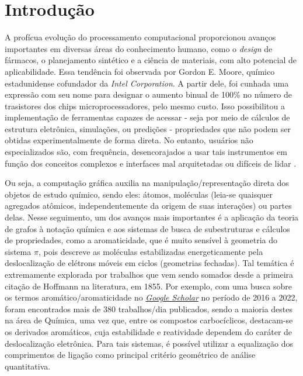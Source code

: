 \chapter{Introdução}

A profícua evolução do processamento computacional proporcionou avanços importantes em diversas áreas do conhecimento humano, como o \textit{design} de fármacos, o planejamento sintético e a ciência de materiais, com alto potencial de aplicabilidade. Essa tendência foi observada por Gordon E. Moore, químico estadunidense 
cofundador da \textit{Intel Corporation}. A partir dele, foi cunhada uma expressão com seu nome para designar o aumento binual de 100\% no número de trasistores dos chips microprocessadores, pelo mesmo custo. Isso possibilitou a implementação de ferramentas capazes de acessar - seja por meio de cálculos de estrutura eletrônica, 
simulações, ou predições - propriedades que não podem ser obtidas experimentalmente de forma direta. No entanto, usuários não especializados são, com frequência, desencorajados a usar tais instrumentos em função dos conceitos complexos e interfaces mal arquitetadas ou difíceis de lidar \autocite{Allouche2010}.

Ou seja, a computação gráfica auxilia na manipulação/representação direta dos objetos de estudo químico, sendo eles: átomos, moléculas (leia-se quaisquer agregados atômicos, independentemente da origem de suas interações) ou partes delas. Nesse seguimento, um dos avanços mais importantes é a aplicação da teoria de grafos à notação química e aos sistemas de busca de subestruturas e cálculos de propriedades, como a aromaticidade, que é muito sensível à geometria do sistema $\pi$, pois descreve as moléculas estabilizadas energeticamente pela deslocalização de elétrons móveis em ciclos (geometrias fechadas). Tal temática é extremamente explorada por trabalhos que vem sendo somados desde a primeira citação de Hoffmann na literatura, em 1855. Por exemplo, com uma busca sobre os termos aromático/aromaticidade no \textit{\href{https://scholar.google.com.br/scholar?hl=pt-BR&as_sdt=0\%2C5&as_ylo=2016&as_yhi=2022&q=aromatic&btnG=}{Google Scholar}} no período de 2016 a 2022, foram encontrados mais de 380 trabalhos/dia publicados, sendo a maioria destes na área de Química, uma vez que, entre os compostos carbocíclicos, destacam-se os derivados aromáticos, cuja estabilidade e reatividade dependem do caráter de deslocalização eletrônica. Para tais sistemas, é possível utilizar a equalização dos comprimentos de ligação como principal critério geométrico de análise quantitativa.


